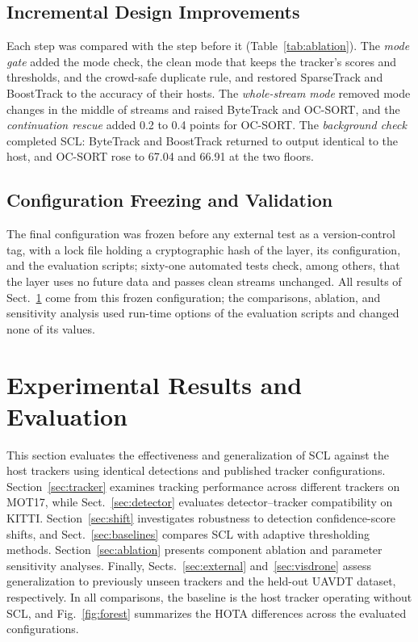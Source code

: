 \documentclass[pdflatex,sn-mathphys-num,iicol]{sn-jnl}
\newcommand{\scl}{SCL}
\begin{document}
\subsection{Incremental Design Improvements}\label{sec:steps}
Each step was compared with the step before it (Table~\ref{tab:ablation}). The \emph{mode gate}
added the mode check, the clean mode that keeps the tracker's scores and thresholds, and the
crowd-safe duplicate rule, and restored SparseTrack and BoostTrack to the accuracy of their hosts.
The \emph{whole-stream mode} removed mode changes in the middle of streams and raised ByteTrack and
OC-SORT, and the \emph{continuation rescue} added 0.2 to 0.4 points for OC-SORT. The
\emph{background check} completed \scl{}: ByteTrack and BoostTrack returned to output identical to
the host, and OC-SORT rose to 67.04 and 66.91 at the two floors.

\subsection{Configuration Freezing and Validation}\label{sec:freeze}
The final configuration was frozen before any external test as a version-control tag, with a lock
file holding a cryptographic hash of the layer, its configuration, and the evaluation scripts;
sixty-one automated tests check, among others, that the layer uses no future data and passes clean
streams unchanged. All results of Sect.~\ref{sec:results} come from this frozen configuration; the
comparisons, ablation, and sensitivity analysis used run-time options of the evaluation scripts and
changed none of its values.
\section{Experimental Results and Evaluation}\label{sec:results}

This section evaluates the effectiveness and generalization of \scl{} against the host trackers
using identical detections and published tracker configurations. Section~\ref{sec:tracker}
examines tracking performance across different trackers on MOT17, while Sect.~\ref{sec:detector}
evaluates detector--tracker compatibility on KITTI. Section~\ref{sec:shift} investigates robustness
to detection confidence-score shifts, and Sect.~\ref{sec:baselines} compares \scl{} with adaptive
thresholding methods. Section~\ref{sec:ablation} presents component ablation and parameter
sensitivity analyses. Finally, Sects.~\ref{sec:external} and~\ref{sec:visdrone} assess
generalization to previously unseen trackers and the held-out UAVDT dataset, respectively. In all
comparisons, the baseline is the host tracker operating without \scl{}, and Fig.~\ref{fig:forest}
summarizes the HOTA differences across the evaluated configurations.
\end{document}
